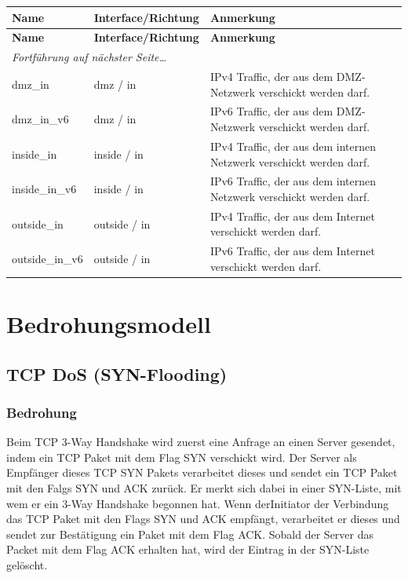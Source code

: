 \documentclass[11pt,a4paper,parskip=half]{scrartcl}
\begin{document}
\begin{longtable}{p{2.5cm}|p{3.5cm}|p{7cm}}
	\textbf{Name} & \textbf{Interface/Richtung} & \textbf{Anmerkung}\\
	\hline
	\endfirsthead
	\textbf{Name} & \textbf{Interface/Richtung} & \textbf{Anmerkung}\\
	\hline
	\endhead
	\hline
	\multicolumn{2}{l}{\textit{Fortführung auf nächster Seite\ldots}} \\
	\endfoot
	\endlastfoot
	dmz\_in & dmz / in & IPv4 Traffic, der aus dem DMZ-Netzwerk verschickt werden darf.\\
	dmz\_in\_v6 & dmz / in & IPv6 Traffic, der aus dem DMZ-Netzwerk verschickt werden darf.\\
	inside\_in  & inside / in & IPv4 Traffic, der aus dem internen Netzwerk verschickt werden darf.\\
	inside\_in\_v6 & inside / in & IPv6 Traffic, der aus dem internen Netzwerk verschickt werden darf.\\
	outside\_in & outside / in & IPv4 Traffic, der aus dem Internet verschickt werden darf.\\
	outside\_in\_v6 & outside / in & IPv6 Traffic, der aus dem Internet verschickt werden darf.\\
\end{longtable}

\newpage
\section{Bedrohungsmodell}
\subsection{TCP DoS (SYN-Flooding)}
\subsubsection{Bedrohung}
Beim TCP 3-Way Handshake wird zuerst eine Anfrage an einen Server gesendet, indem ein TCP Paket mit dem Flag SYN verschickt wird. Der Server als Empfänger dieses TCP SYN Pakets verarbeitet dieses und sendet ein TCP Paket mit den Falgs SYN und ACK zurück. Er merkt sich dabei in einer SYN-Liste, mit wem er ein 3-Way Handshake begonnen hat. Wenn derInitiator der Verbindung das TCP Paket mit den Flags SYN und ACK empfängt, verarbeitet er dieses und sendet zur Bestätigung ein Paket mit dem Flag ACK. Sobald der Server das Packet mit dem Flag ACK erhalten hat, wird der Eintrag in der SYN-Liste gelöscht.
\end{document}
